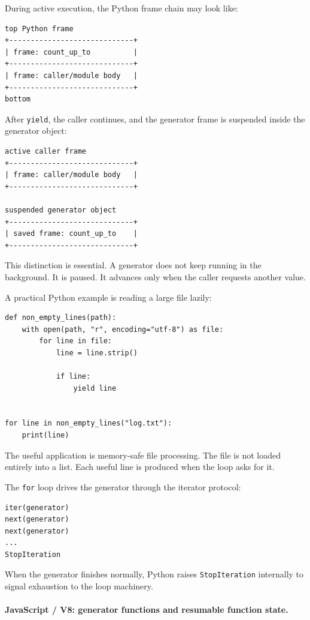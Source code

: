 During active execution, the Python frame chain may look like:

\begin{verbatim}
top Python frame
+-----------------------------+
| frame: count_up_to          |
+-----------------------------+
| frame: caller/module body   |
+-----------------------------+
bottom
\end{verbatim}

After \texttt{yield}, the caller continues, and the generator frame is suspended inside the generator object:

\begin{verbatim}
active caller frame
+-----------------------------+
| frame: caller/module body   |
+-----------------------------+

suspended generator object
+-----------------------------+
| saved frame: count_up_to    |
+-----------------------------+
\end{verbatim}

This distinction is essential. A generator does not keep running in the background. It is paused. It advances only when the caller requests another value.

A practical Python example is reading a large file lazily:

\begin{verbatim}
def non_empty_lines(path):
    with open(path, "r", encoding="utf-8") as file:
        for line in file:
            line = line.strip()

            if line:
                yield line


for line in non_empty_lines("log.txt"):
    print(line)
\end{verbatim}

The useful application is memory-safe file processing. The file is not loaded entirely into a list. Each useful line is produced when the loop asks for it.

The \texttt{for} loop drives the generator through the iterator protocol:

\begin{verbatim}
iter(generator)
next(generator)
next(generator)
...
StopIteration
\end{verbatim}

When the generator finishes normally, Python raises \texttt{StopIteration} internally to signal exhaustion to the loop machinery.

\paragraph{JavaScript / V8: generator functions and resumable function state.}


